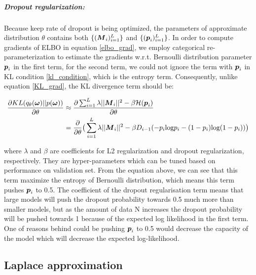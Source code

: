 \subparagraph{Dropout regularization:}
Because keep rate of dropout is being optimized, the parameters of approximate distribution $\theta$ contains both $\{ (\boldsymbol M_i)_{i=1}^{L} \}$ and $\{(\boldsymbol p_i)_{i=1}^{L} \}$. In order to compute gradients of ELBO in equation \ref{elbo_grad}, we employ categorical re-parameterization to estimate the gradients w.r.t. Bernoulli distribution parameter $\boldsymbol p_i$ in the first term, for the second term, we could not ignore the term with $\boldsymbol p_i$ in KL condition \ref{kl_condition}, which is the entropy term. Consequently, unlike equation \ref{KL_grad}, the KL divergence term should be:

\begin{equation} 
\begin{aligned}\label{KL_grad_concrete}
\frac{\partial KL(q_{\theta}(\boldsymbol \omega)||p(\boldsymbol \omega))}{\partial \theta} 
&\approx \frac{\partial \sum_{i=1}^{L}\lambda||\boldsymbol M_{i}||^{2}- \beta\mathcal H(\boldsymbol p_{i})}{\partial \theta}  \\
&= \frac{\partial}{\partial \theta} \big( \sum_{i=1}^{L}\lambda||\boldsymbol M_{i}||^{2}- \beta D_{i-1}(-p_{i}\text{log}p_{i} - (1-p_{i})\text{log}(1-p_{i}))\big)
\end{aligned}
\end{equation}

where $\lambda$ and $\beta$ are coefficients for L2 regularization and dropout regularization, respectively. They are hyper-parameters which can be tuned based on performance on validation set.
From the equation above, we can see that this term maximize the entropy of Bernoulli distribution, which means this term pushes $\boldsymbol p_i$ to 0.5. The coefficient of the dropout regularisation term means that large models will push the dropout probability towards 0.5 much more than smaller models, but as the amount of data N increases the dropout probability will be pushed towards 1 because of the expected log likelihood in the first term. One of reasons behind could be pushing $\boldsymbol p_i$ to 0.5 would decrease the capacity of the model which will decrease the expected log-likelihood. 


\subsection{Laplace approximation}
